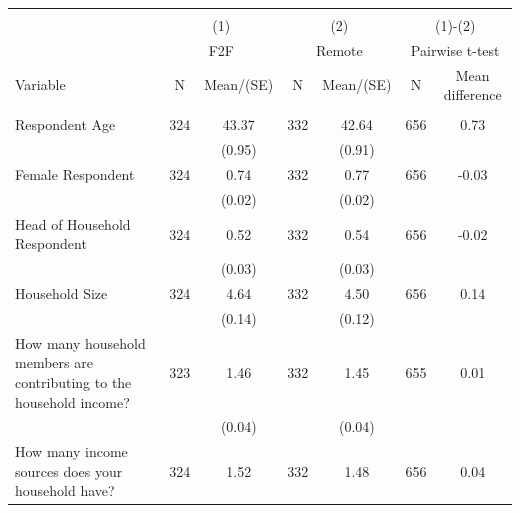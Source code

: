 
\begin{tabular}{@{\extracolsep{5pt}}lcccccc}
\\[-1.8ex]\hline \hline \\[-1.8ex]
 & \multicolumn{2}{c}{(1)}  & \multicolumn{2}{c}{(2)}  & \multicolumn{2}{c}{(1)-(2)} \\
 & \multicolumn{2}{c}{F2F}  & \multicolumn{2}{c}{Remote}  & \multicolumn{2}{c}{Pairwise t-test}  \\
Variable & N & Mean/(SE) & N & Mean/(SE) & N & Mean difference \\ \hline \\[-1.8ex] 
Respondent Age   & 324    & 43.37    & 332    & 42.64    & 656    & 0.73   \\
 &   & (0.95)  &   & (0.91)  &   &  \\ [1ex]
Female Respondent   & 324    & 0.74    & 332    & 0.77    & 656    & -0.03   \\
 &   & (0.02)  &   & (0.02)  &   &  \\ [1ex]
Head of Household Respondent   & 324    & 0.52    & 332    & 0.54    & 656    & -0.02   \\
 &   & (0.03)  &   & (0.03)  &   &  \\ [1ex]
Household Size   & 324    & 4.64    & 332    & 4.50    & 656    & 0.14   \\
 &   & (0.14)  &   & (0.12)  &   &  \\ [1ex]
How many household members are contributing to the household income?   & 323    & 1.46    & 332    & 1.45    & 655    & 0.01   \\
 &   & (0.04)  &   & (0.04)  &   &  \\ [1ex]
How many income sources does your household have?   & 324    & 1.52    & 332    & 1.48    & 656    & 0.04   \\

\end{tabular}
